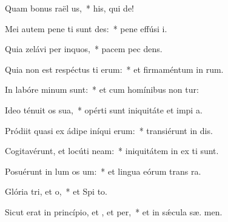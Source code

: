 \item Quam bonus raël us,~* his, qui   de!
\item Mei autem pene ti sunt des:~* pene effúsi   i.
\item Quia zelávi per inquos,~* pacem pec dens.
\item Quia non est respéctus ti erum:~* et firmaméntum in  rum.
\item In labóre minum  sunt:~* et cum homínibus non tur:
\item Ideo ténuit os sua,~* opérti sunt iniquitáte et impi a.
\item Pródiit quasi ex ádipe iníqui erum:~* transiérunt in  dis.
\item Cogitavérunt, et locúti  neam:~* iniquitátem in ex ti sunt.
\item Posuérunt in lum os um:~* et lingua eórum trans  ra.
\item Glória tri, et o,~* et Spi to.
\item Sicut erat in princípio, et , et per,~* et in sǽcula sæ. men.
